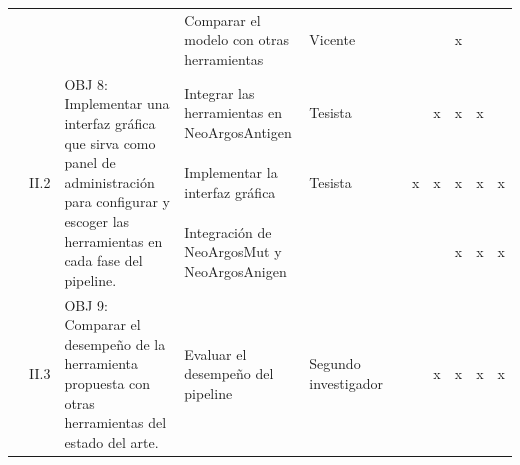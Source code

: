 \documentclass[a4paper,11pt]{article}
\begin{document}
\begin{table}[H]
\begin{tabular}{p{0.6cm}p{0.6cm}p{6cm}p{4cm}p{1cm}cccccc}
		&                       &                                                                                                                                                                                                                                                                                            & Comparar el modelo con otras herramientas                                                            & Vicente            &                       &                        & \multicolumn{1}{l}{} & x                    &                       &                        \\
		& \multirow{3}{*}{II.2} & \multirow{3}{6cm}{OBJ 8: Implementar una interfaz gráfica que sirva como panel de administración para configurar y escoger las herramientas en cada fase del pipeline.}                                                                                                                   & Integrar las herramientas en NeoArgosAntigen                                                         & Tesista            &                       &                        & x                    & x                    & \multicolumn{1}{c}{x} &                        \\
		&                       &                                                                                                                                                                                                                                                                                            & Implementar la interfaz gráfica                                                                      & Tesista            &                       & \multicolumn{1}{c}{x}  & x                    & x                    & \multicolumn{1}{c}{x} & \multicolumn{1}{c}{x}  \\
		&                       &                                                                                                                                                                                                                                                                                            & Integración de NeoArgosMut y NeoArgosAnigen                                                          &                    &                       &                        & \multicolumn{1}{l}{} & x                    & \multicolumn{1}{c}{x} & \multicolumn{1}{c}{x}  \\
		& \multirow{4}{*}{II.3} & \multirow{4}{6cm}{OBJ 9: Comparar el desempeño de la herramienta propuesta con otras herramientas del estado del arte.}                                                                                                                                                                   & Evaluar el desempeño del pipeline                                                                    & Segundo investigador              &                       &                        & x                    & x                    & \multicolumn{1}{c}{x} & \multicolumn{1}{c}{x}  \\

\end{tabular}
\end{table}
\end{document}
